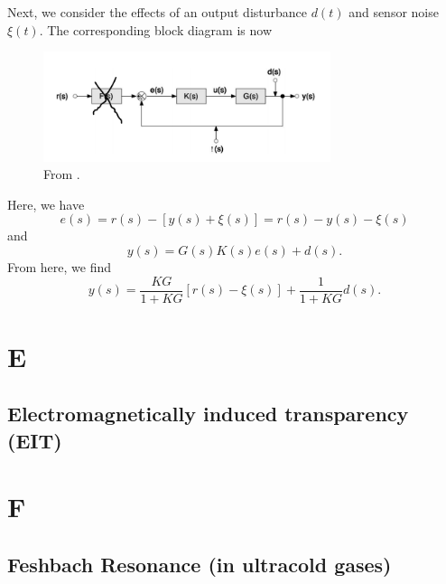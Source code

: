 \documentclass{book}
\theoremstyle{definition}
\newcommand{\f}[2]{\frac{#1}{#2}}
\begin{document}
Next, we consider the effects of an output disturbance $d(t)$ and sensor noise $\xi(t)$. The corresponding block diagram is now
\begin{figure}[!htb]
	\centering
	\includegraphics[width=0.75\textwidth]{images/block-3}
	\caption{From \cite{bechhoefer2005feedback}.}
\end{figure}
Here, we have
\begin{equation*}
e(s) = r(s) - [y(s) + \xi(s)] = r(s) - y(s) - \xi(s) 
\end{equation*}
and
\begin{equation*}
y(s) = G(s) K(s) e(s) + d(s).
\end{equation*}
From here, we find 
\begin{equation*}
y(s) = \f{KG}{1+KG}[r(s) - \xi(s)] + \f{1}{1+ KG}d(s). 
\end{equation*}












\chapter*{E}



\section*{Electromagnetically induced transparency (EIT)}



\chapter*{F}


\section*{Feshbach Resonance (in ultracold gases)}
\end{document}
